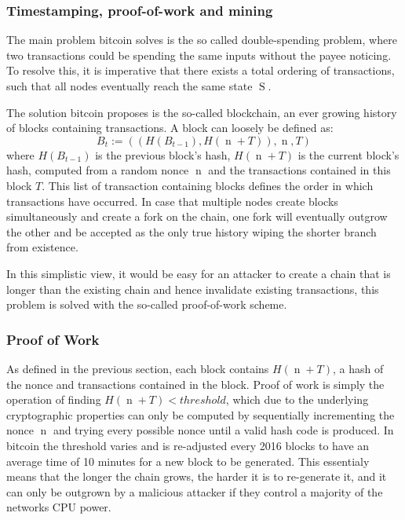 \documentclass[12pt,msc,a4paper,oneside]{ucl_thesis}
\DeclareMathOperator{\Btcstate}{S}
\DeclareMathOperator{\nonce}{n}
\begin{document}
\subsubsection{Timestamping, proof-of-work and mining}
The main problem bitcoin solves is the so called double-spending problem, where two transactions could be spending the same inputs without the payee noticing. To resolve this, it is imperative that there exists a total ordering of transactions, such that all nodes eventually reach the same state $\Btcstate$.

The solution bitcoin proposes is the so-called blockchain, an ever growing history of blocks containing transactions. A block can loosely be defined as:
\begin{equation}
    B_t := ((H(B_{t-1}), H(\nonce + T)), \nonce, T)
\end{equation}
where $H(B_{t-1})$ is the previous block's hash, $H(\nonce + T)$ is the current block's hash, computed from a random nonce $\nonce$ and the transactions contained in this block $T$. This list of transaction containing blocks defines the order in which transactions have occurred. In case that multiple nodes create blocks simultaneously and create a fork on the chain, one fork will eventually outgrow the other and be accepted as the only true history wiping the shorter branch from existence.

In this simplistic view, it would be easy for an attacker to create a chain that is longer than the existing chain and hence invalidate existing transactions, this problem is solved with the so-called proof-of-work scheme.

\subsubsection{Proof of Work} \label{sec:background_bitcoin:proof_of_work}
As defined in the previous section, each block contains $H(\nonce + T)$, a hash of the nonce and transactions contained in the block. Proof of work is simply the operation of finding $H(\nonce + T) < threshold$, which due to the underlying cryptographic properties can only be computed by sequentially incrementing the nonce $\nonce$ and trying every possible nonce until a valid hash code is produced. In bitcoin the threshold varies and is re-adjusted every 2016 blocks to have an average time of 10 minutes for a new block to be generated. This essentialy means that the longer the chain grows, the harder it is to re-generate it, and it can only be outgrown by a malicious attacker if they control a majority of the networks CPU power.
\end{document}
